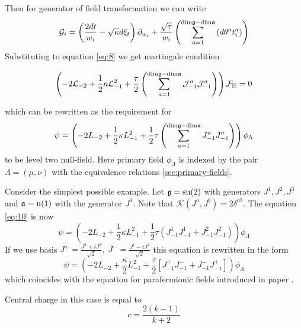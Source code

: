 Then for generator of field transformation we can write 
\begin{equation}
  \mathcal{G}_{i}=\left(\frac{2dt}{w_{i}}-\sqrt{\kappa} d\xi_{t}\right) \partial_{w_{i}}+\frac{\sqrt{\tau}}{w_{i}}\left(\sum_{a=1}^{\mathrm{dim}\mathfrak{g}-\mathrm{dim}\mathfrak{a}}\left(d \theta ^{a} t^{a}_{i}\right)\right)
\label{eq:5}
\end{equation}
Substituting to equation \eqref{eq:8} we get martingale condition

\begin{equation}
  \left(-2 \mathcal{L}_{-2}+\frac{1}{2}\kappa \mathcal{L}_{-1}^{2}+\frac{\tau}{2}\left( \sum_{a=1}^{\mathrm{dim}\mathfrak{g}-\mathrm{dim}\mathfrak{a}} \mathcal{J}^{a}_{-1} \mathcal{J}^{a}_{-1}\right)\right)        \mathcal{F}_{\mathbb{H}}=0
\label{eq:9}
\end{equation}

which can be rewritten as the requirement for
\begin{equation}
  \psi=\left(-2L_{-2}+\frac{1}{2}\kappa L_{-1}^{2}+\frac{1}{2}\tau \left(\sum_{a=1}^{\mathrm{dim}\mathfrak{g}-\mathrm{dim}\mathfrak{a}}J^{a}_{-1}J^{a}_{-1}\right)\right) \phi_{\Lambda}
\label{eq:10}
\end{equation}
to be level two null-field. Here primary field $\phi_{\Lambda}$ is indexed by the pair $\Lambda=(\mu,\nu)$ with the equivalence relations \ref{sec:primary-fields}.

Consider the simplest possible example. Let $\mathfrak{g}=\mathrm{su}(2)$ with generators $J^{1},J^{2},J^{3}$ and $\mathfrak{a}=\mathrm{u}(1)$ with the generator $J^{3}$. Note that $\mathcal{K}(J^{a},J^{b})=2\delta^{ab}$. The equation \eqref{eq:10} is now
\begin{equation}
  \label{eq:11}
  \psi=\left(-2L_{-2}+\frac{1}{2}\kappa L_{-1}^{2}+\frac{1}{2}\tau \left(J^{1}_{-1}J^{1}_{-1}+J^{2}_{-1}J^{2}_{-1}\right)\right) \phi_{\Lambda}
\end{equation}
If we use basis $J^{+}=\frac{J^{1}+iJ^{2}}{\sqrt{2}},\; J^{-}=\frac{J^{1}-iJ^{2}}{\sqrt{2}}$ this equation is rewritten in the form
\begin{equation}
 \psi= \left(-2 L_{-2}+\frac{\kappa}{2}L_{-1}^{2}+\frac{\tau}{2}\left[J^{+}_{-1}J^{-}_{-1}+J^{-}_{-1}J^{+}_{-1}\right]\right) \phi_{\Lambda}
\label{eq:12}
\end{equation}
which coincides with the equation for parafermionic fields introduced in paper \cite{santachiara2008sle}.

Central charge in this case is equal to
\begin{equation}
  \label{eq:14}
  c=\frac{2(k-1)}{k+2}
\end{equation}

